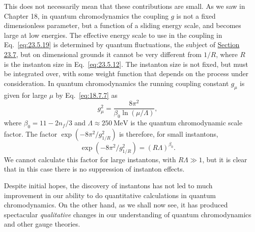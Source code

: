 This does not necessarily mean that these contributions are small. As we
saw in Chapter 18, in quantum chromodynamics the coupling $g$ is not a
fixed dimensionless parameter, but a function of a sliding energy scale,
and becomes large at low energies. The effective energy scale to use in
the coupling in Eq.~\eqref{eq:23.5.19} is determined by quantum
fluctuations, the subject of \hyperref[sec:23.7]{Section 23.7}, but on dimensional grounds it
cannot be very different from $1/R$, where $R$ is the instanton size in
Eq.~\eqref{eq:23.5.12}. The instanton size is not fixed, but must be
integrated over, with some weight function that depends on the process
under consideration. In quantum chromodynamics the running coupling
constant $g_\mu$ is given for large $\mu$ by Eq.~\eqref{eq:18.7.7} as
\[
g_\mu^2=\frac{8\pi^2}{\beta_0\ln(\mu/\Lambda)},
\]
where $\beta_0=11-2n_f/3$ and $\Lambda\approx250\ \mathrm{MeV}$ is the
quantum chromodynamic scale factor. The factor
$\exp(-8\pi^2/g_{1/R}^2)$ is therefore, for small instantons,
\[
\exp\left(-8\pi^2/g_{1/R}^2\right)=(R\Lambda)^{\beta_0}.
\]
We cannot calculate this factor for large instantons, with
$R\Lambda\gg1$, but it is clear that in this case there is no suppression
of instanton effects.

Despite initial hopes, the discovery of instantons has not led to much
improvement in our ability to do quantitative calculations in quantum
chromodynamics. On the other hand, as we shall now see, it has produced
spectacular \emph{qualitative} changes in our understanding of quantum
chromodynamics and other gauge theories.

